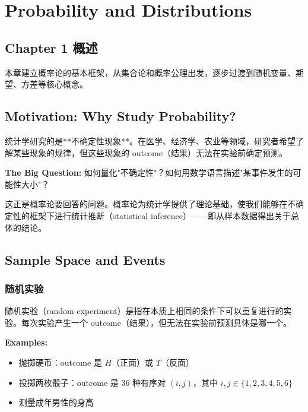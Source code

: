 \chapter{Probability and Distributions}\label{chap:probability-distribution}

\section*{Chapter 1 概述}

本章建立概率论的基本框架，从集合论和概率公理出发，逐步过渡到随机变量、期望、方差等核心概念。

\section{Motivation: Why Study Probability?}\label{sec:probability-motivation}

统计学研究的是**不确定性现象**。在医学、经济学、农业等领域，研究者希望了解某些现象的规律，但这些现象的 outcome（结果）无法在实验前确定预测。

\bigskip

\textbf{The Big Question:} 如何量化"不确定性"？如何用数学语言描述"某事件发生的可能性大小"？

\bigskip

这正是概率论要回答的问题。概率论为统计学提供了理论基础，使我们能够在不确定性的框架下进行统计推断（statistical inference）——即从样本数据得出关于总体的结论。

\section{Sample Space and Events}\label{sec:sample-space-events}

\subsection{随机实验}\label{sub:random-experiment}

\begin{Definition}[随机实验]\label{def:random-experiment}
随机实验（random experiment）是指在本质上相同的条件下可以重复进行的实验。每次实验产生一个 outcome（结果），但无法在实验前预测具体是哪一个。
\end{Definition}

\textbf{Examples:}
\begin{itemize}
    \item 抛掷硬币：outcome 是 $H$（正面）或 $T$（反面）
    \item 投掷两枚骰子：outcome 是 36 种有序对 $(i,j)$，其中 $i,j \in \{1,2,3,4,5,6\}$
    \item 测量成年男性的身高
\end{itemize}

